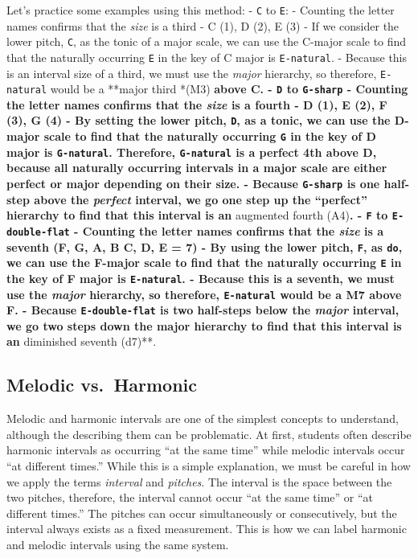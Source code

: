 \documentclass{book}
\begin{document}
Let's practice some examples using this method: - \texttt{C} to \texttt{E}: -
Counting the letter names confirms that the \emph{size} is a third - C (1), D
(2), E (3) - If we consider the lower pitch, \texttt{C}, as the tonic of a
major scale, we can use the C-major scale to find that the naturally occurring
\texttt{E} in the key of C major is \texttt{E-natural}. - Because this is an
interval size of a third, we must use the \emph{major} hierarchy, so
therefore, \texttt{E-natural} would be a **major third *(M3)\textbf{ above C.
- \texttt{D} to \texttt{G-sharp} - Counting the letter names confirms that the
\emph{size} is a fourth - D (1), E (2), F (3), G (4) - By setting the lower
pitch, \texttt{D}, as a tonic, we can use the D-major scale to find that the
naturally occurring \texttt{G} in the key of D major is \texttt{G-natural}.
Therefore, \texttt{G-natural} is a perfect 4th above D, because all naturally
occurring intervals in a major scale are either perfect or major depending on
their size. - Because \texttt{G-sharp} is one half-step above the
\emph{perfect} interval, we go one step up the ``perfect'' hierarchy to find
that this interval is an }augmented fourth (A4)\textbf{. - \texttt{F} to
\texttt{E-double-flat} - Counting the letter names confirms that the
\emph{size} is a seventh (F, G, A, B C, D, E = 7) - By using the lower pitch,
\texttt{F}, as \texttt{do}, we can use the F-major scale to find that the
naturally occurring \texttt{E} in the key of F major is \texttt{E-natural}. -
Because this is a seventh, we must use the \emph{major} hierarchy, so
therefore, \texttt{E-natural} would be a M7 above F. - Because
\texttt{E-double-flat} is two half-steps below the \emph{major} interval, we
go two steps down the major hierarchy to find that this interval is an
}diminished seventh (d7)**.

\hypertarget{melodic-vs.-harmonic}{%
\subsection{Melodic vs.~Harmonic}\label{melodic-vs.-harmonic}}

Melodic and harmonic intervals are one of the simplest concepts to understand,
although the describing them can be problematic. At first, students often
describe harmonic intervals as occurring ``at the same time'' while melodic
intervals occur ``at different times.'' While this is a simple explanation, we
must be careful in how we apply the terms \emph{interval} and \emph{pitches}.
The interval is the space between the two pitches, therefore, the interval
cannot occur ``at the same time'' or ``at different times.'' The pitches can
occur simultaneously or consecutively, but the interval always exists as a
fixed measurement. This is how we can label harmonic and melodic intervals
using the same system.
\end{document}
